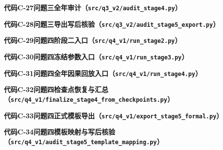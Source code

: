 \documentclass[zihao=-4,a4paper,UTF8,fontset=none]{ctexart}
\begin{document}
\begin{center}\textbf{代码C-27\quad 问题三全年审计（\texttt{src/q3\_v2/audit\_stage4.py}）}\end{center}

\begin{center}\textbf{代码C-28\quad 问题三导出写后核验（\texttt{src/q3\_v2/audit\_stage5\_export.py}）}\end{center}


\begin{center}\textbf{代码C-29\quad 问题四阶段二入口（\texttt{src/q4\_v1/run\_stage2.py}）}\end{center}

\begin{center}\textbf{代码C-30\quad 问题四冻结参数入口（\texttt{src/q4\_v1/run\_stage3.py}）}\end{center}

\begin{center}\textbf{代码C-31\quad 问题四全年因果回放入口（\texttt{src/q4\_v1/run\_stage4.py}）}\end{center}

\begin{center}\textbf{代码C-32\quad 问题四检查点恢复与汇总（\texttt{src/q4\_v1/finalize\_stage4\_from\_checkpoints.py}）}\end{center}

\begin{center}\textbf{代码C-33\quad 问题四正式模板导出（\texttt{src/q4\_v1/export\_stage5\_formal.py}）}\end{center}

\begin{center}\textbf{代码C-34\quad 问题四模板映射与写后核验（\texttt{src/q4\_v1/audit\_stage5\_template\_mapping.py}）}\end{center}

\end{document}
